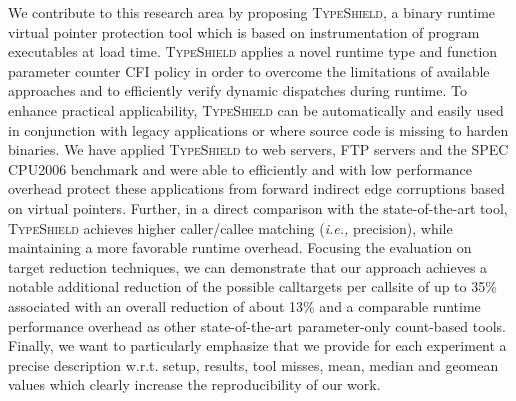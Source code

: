 We contribute to this research area by proposing \textsc{TypeShield}, a binary runtime virtual pointer protection tool 
which is based on instrumentation of program executables at load time. \textsc{TypeShield} applies a novel runtime 
type and function parameter counter CFI policy in order to overcome the limitations of available approaches and to 
efficiently verify dynamic dispatches during runtime. To enhance practical applicability, \textsc{TypeShield} can 
be automatically and easily used in conjunction with legacy applications or where source code is missing to harden 
binaries.
We have applied \textsc{TypeShield} to web servers, FTP servers and the SPEC CPU2006 benchmark and were able to 
efficiently and with low performance overhead protect these applications from forward indirect edge corruptions 
based on virtual pointers. Further, in a direct comparison with the state-of-the-art tool, \textsc{TypeShield} 
achieves higher caller/callee matching (\textit{i.e.,} precision), while maintaining a more favorable runtime overhead. 
Focusing the evaluation on target reduction techniques, we can demonstrate that our approach achieves a notable 
additional reduction of the possible calltargets per callsite of up to 35\% associated with an overall reduction
of about 13\% and a comparable runtime performance overhead as other state-of-the-art parameter-only count-based tools.
Finally, we want to particularly emphasize that we provide for each experiment a precise description
w.r.t. setup, results, tool misses, mean, median and geomean values which clearly increase
the reproducibility of our work.